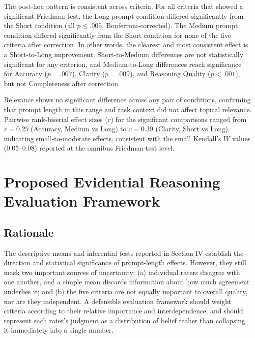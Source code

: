 \documentclass[conference]{IEEEtran}
\begin{document}
The post-hoc pattern is consistent across criteria. For all criteria that showed a significant Friedman test, the Long prompt condition differed significantly from the Short condition (all $p \leq .005$, Bonferroni-corrected). The Medium prompt condition differed significantly from the Short condition for none of the five criteria after correction. In other words, the clearest and most consistent effect is a Short-to-Long improvement; Short-to-Medium differences are not statistically significant for any criterion, and Medium-to-Long differences reach significance for Accuracy ($p=.007$), Clarity ($p=.009$), and Reasoning Quality ($p<.001$), but not Completeness after correction.

Relevance shows no significant difference across any pair of conditions, confirming that prompt length in this range and task context did not affect topical relevance. Pairwise rank-biserial effect sizes ($r$) for the significant comparisons ranged from $r=0.25$ (Accuracy, Medium vs Long) to $r=0.39$ (Clarity, Short vs Long), indicating small-to-moderate effects, consistent with the small Kendall's $W$ values (0.05--0.08) reported at the omnibus Friedman-test level.

\section{Proposed Evidential Reasoning Evaluation Framework}

\subsection{Rationale}
The descriptive means and inferential tests reported in Section IV establish the direction and statistical significance of prompt-length effects. However, they still mask two important sources of uncertainty: (a) individual raters disagree with one another, and a simple mean discards information about how much agreement underlies it; and (b) the five criteria are not equally important to overall quality, nor are they independent. A defensible evaluation framework should weight criteria according to their relative importance and interdependence, and should represent each rater's judgment as a distribution of belief rather than collapsing it immediately into a single number.
\end{document}

